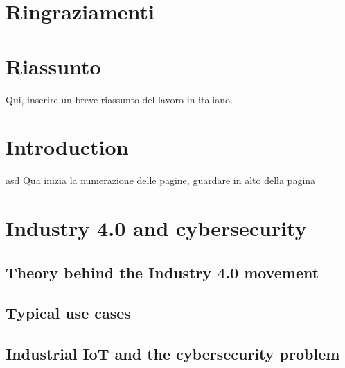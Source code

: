 \documentclass[a4paper, 12pt]{book}
\begin{document}
\pagestyle{empty}
\clearpage
\tableofcontents
\thispagestyle{empty}

\chapter{Ringraziamenti}


\chapter{Riassunto}

Qui, inserire un breve riassunto del lavoro in italiano.


\chapter{Introduction}
\pagestyle{fancy}
\fancyhf{}
\renewcommand{\headrulewidth}{2pt}
\fancyhead[EL]{\textbf{\textsf{\nouppercase\thepage}}}
\fancyhead[ER]{\textbf{\textsf{\nouppercase\leftmark}}}
\fancyhead[OR]{\textbf{\textsf{\nouppercase\thepage}}}
\fancyhead[OL]{\textbf{\textsf{\nouppercase {\rightmark}}}}

\thispagestyle{empty}

asd
\newpage
Qua inizia la numerazione delle pagine, guardare in alto della pagina

\chapter{Industry 4.0 and cybersecurity}

\section{Theory behind the Industry 4.0 movement}
\section{Typical use cases}
\section{Industrial IoT and the cybersecurity problem}
\end{document}
